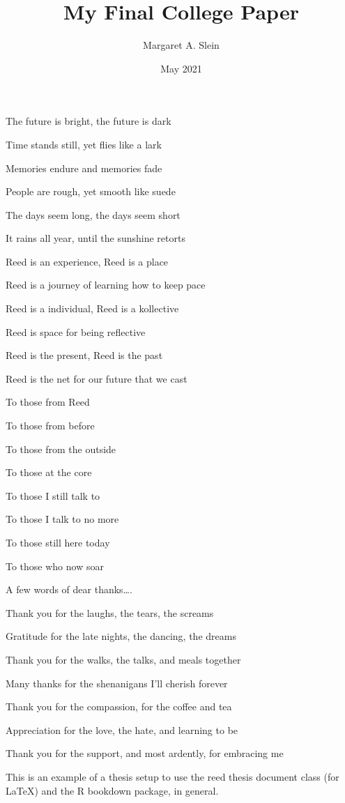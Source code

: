 \documentclass[12pt,twoside]{reedthesis}
\title{My Final College Paper}
\author{Margaret A. Slein}
\date{May 2021}
\begin{document}
  \maketitle

\frontmatter %
\pagestyle{empty} %
  \begin{acknowledgements}
    The future is bright, the future is dark
    
    Time stands still, yet flies like a lark
    
    Memories endure and memories fade
    
    People are rough, yet smooth like suede
    
    The days seem long, the days seem short
    
    It rains all year, until the sunshine retorts
    
    Reed is an experience, Reed is a place
    
    Reed is a journey of learning how to keep pace
    
    Reed is a individual, Reed is a kollective
    
    Reed is space for being reflective
    
    Reed is the present, Reed is the past
    
    Reed is the net for our future that we cast
    
    To those from Reed
    
    To those from before
    
    To those from the outside
    
    To those at the core
    
    To those I still talk to
    
    To those I talk to no more
    
    To those still here today
    
    To those who now soar
    
    A few words of dear thanks\ldots{}.
    
    Thank you for the laughs, the tears, the screams
    
    Gratitude for the late nights, the dancing, the dreams
    
    Thank you for the walks, the talks, and meals together
    
    Many thanks for the shenanigans I'll cherish forever
    
    Thank you for the compassion, for the coffee and tea
    
    Appreciation for the love, the hate, and learning to be
    
    Thank you for the support, and most ardently, for embracing me
  \end{acknowledgements}
  \begin{preface}
    This is an example of a thesis setup to use the reed thesis document class
    (for LaTeX) and the R bookdown package, in general.
  \end{preface}
  \hypersetup{linkcolor=black}
  \setcounter{secnumdepth}{2}
  \setcounter{tocdepth}{2}
  \tableofcontents
\end{document}
